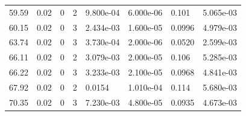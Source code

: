 \documentclass[preview]{standalone}
\begin{document}
{{\begin{tabular}{L{1.2cm}C{1.2cm} C{0.3cm}C{0.5cm} C{1.4cm}C{1.4cm} C{1.4cm}C{1.4cm}}
  59.59  &  0.02  & 0     &  2 &  9.800e-04  & 6.000e-06  & 0.101 &  5.065e-03   \\ 
  60.15  &  0.02  & 0     &  3 &  2.434e-03  & 1.600e-05  & 0.0996 &  4.979e-03   \\ 
  63.74  &  0.02  & 0     &  3 &  3.730e-04  & 2.000e-06  & 0.0520 &  2.599e-03   \\ 
  66.11  &  0.02  & 0     &  2 &  3.079e-03  & 2.000e-05  & 0.106 &  5.285e-03   \\ 
  66.22  &  0.02  & 0     &  3 &  3.233e-03  & 2.100e-05  & 0.0968 &  4.841e-03   \\ 
  67.92  &  0.02  & 0     &  2 &  0.0154  & 1.010e-04  & 0.114 &  5.680e-03   \\ 
  70.35  &  0.02  & 0     &  3 &  7.230e-03  & 4.800e-05  & 0.0935 &  4.673e-03   \\ 
\hline 
\end{tabular} 

}}
\end{document}
